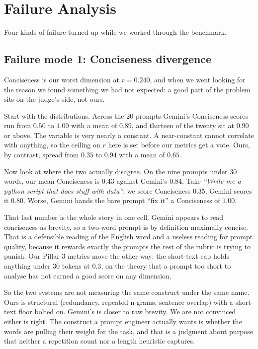 \documentclass[conference]{IEEEtran}
\begin{document}
\section{Failure Analysis}

Four kinds of failure turned up while we worked through the benchmark.

\subsection{Failure mode 1: Conciseness divergence}
\label{sec:failure1}
Conciseness is our worst dimension at $r = 0.240$, and when we went looking for the reason we found something we had not expected: a good part of the problem sits on the judge's side, not ours.

Start with the distributions. Across the 20 prompts Gemini's Conciseness scores run from $0.50$ to $1.00$ with a mean of $0.89$, and thirteen of the twenty sit at $0.90$ or above. The variable is very nearly a constant. A near-constant cannot correlate with anything, so the ceiling on $r$ here is set before our metrics get a vote. Ours, by contrast, spread from $0.35$ to $0.94$ with a mean of $0.65$.

Now look at where the two actually disagree. On the nine prompts under 30 words, our mean Conciseness is $0.43$ against Gemini's $0.84$. Take \emph{``Write me a python script that does stuff with data''}: we score Conciseness $0.35$, Gemini scores it $0.80$. Worse, Gemini hands the bare prompt ``fix it'' a Conciseness of $1.00$.

That last number is the whole story in one cell. Gemini appears to read conciseness as brevity, so a two-word prompt is by definition maximally concise. That is a defensible reading of the English word and a useless reading for prompt quality, because it rewards exactly the prompts the rest of the rubric is trying to punish. Our Pillar 3 metrics move the other way: the short-text cap holds anything under 30 tokens at $0.3$, on the theory that a prompt too short to analyse has not earned a good score on any dimension.

So the two systems are not measuring the same construct under the same name. Ours is structural (redundancy, repeated n-grams, sentence overlap) with a short-text floor bolted on. Gemini's is closer to raw brevity. We are not convinced either is right. The construct a prompt engineer actually wants is whether the words are pulling their weight for the task, and that is a judgment about purpose that neither a repetition count nor a length heuristic captures.
\end{document}

